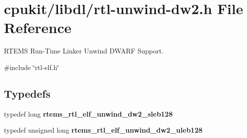 \hypertarget{rtl-unwind-dw2_8h}{}\section{cpukit/libdl/rtl-\/unwind-\/dw2.h File Reference}
\label{rtl-unwind-dw2_8h}


R\+T\+E\+MS Run-\/\+Time Linker Unwind D\+W\+A\+RF Support.  


{\ttfamily \#include \char`\"{}rtl-\/elf.\+h\char`\"{}}\newline
\subsection*{Typedefs}
\begin{DoxyCompactItemize}
\item 
\mbox{\label{rtl-unwind-dw2_8h_ab5ee538cff9b273cabf2b5b8ba1dfdd9}} 
typedef long {\bfseries rtems\+\_\+rtl\+\_\+elf\+\_\+unwind\+\_\+dw2\+\_\+sleb128}
\item 
\mbox{\label{rtl-unwind-dw2_8h_a51eb7ad83566a94dd930dbf0fa807e84}} 
typedef unsigned long {\bfseries rtems\+\_\+rtl\+\_\+elf\+\_\+unwind\+\_\+dw2\+\_\+uleb128}
\end{DoxyCompactItemize}
